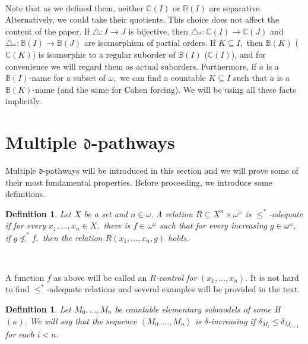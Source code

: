 \documentclass{article}%
\newtheorem{definition}[theorem]{Definition}
\begin{document}
\qquad\qquad\ \ 

Note that as we defined them, neither $\mathbb{C}\left(  I\right)  $ or
$\mathbb{B}\left(  I\right)  $ are separative. Alternatively, we could take
their quotients. This choice does not affect the content of the paper. If
$\triangle:I\longrightarrow J$ is bijective, then $\triangle_{\ast}%
:\mathbb{C}\left(  I\right)  \longrightarrow\mathbb{C}\left(  J\right)  $ and
$\triangle_{\ast}:\mathbb{B}\left(  I\right)  \longrightarrow\mathbb{B}\left(
J\right)  $ are isomorphism of partial orders. If $K\subseteq I,$ then
$\mathbb{B}\left(  K\right)  $ ($\mathbb{C}\left(  K\right)  $) is isomorphic
to a regular suborder of $\mathbb{B}\left(  I\right)  $ ($\mathbb{C}\left(
I\right)  $), and for convenience we will regard them as actual suborders.
Furthermore, if $\dot{a}$ is a $\mathbb{B}\left(  I\right)  $-name for a
subset of $\omega,$ we can find a countable $K\subseteq I$ such that $\dot{a}$
is a $\mathbb{B}\left(  K\right)  $-name (and the same for Cohen forcing). We
will be using all these facts implicitly.

\section{Multiple $\mathfrak{d}$-pathways \label{Seccion multiple pathways}}

Multiple $\mathfrak{d}$-pathways will be introduced in this section and we
will prove some of their most fundamental properties. Before proceeding, we
introduce some definitions.

\begin{definition}
Let $X$ be a set and $n\in\omega.$ A relation $R\subseteq X^{n}\times
\omega^{\omega}$ is $\leq^{\ast}$\emph{-adequate }if for every $x_{1}%
,...,x_{n}\in X,$ there is $f\in\omega^{\omega}$ such that for every
increasing $g\in\omega^{\omega},$ if $g\nleq^{\ast}f,$ then the relation
$R\left(  x_{1},...,x_{n},g\right)  $ holds.
\end{definition}

\qquad\qquad\ \ 

A function $f$ as above will be called an $R$\emph{-control for} $\left(
x_{1},...,x_{n}\right)  .$ It is not hard to find $\leq^{\ast}$-adequate
relations and several examples will be provided in the text.

\begin{definition}
Let $M_{0},...,M_{n}$ be countable elementary submodels of some \textsf{H}%
$\left(  \kappa\right)  .$ We will say that the sequence $\left\langle
M_{0},...,M_{n}\right\rangle $ is $\delta$\emph{-increasing }if $\delta
_{M_{i}}\leq\delta_{M_{i+1}}$ for each $i<n.$
\end{definition}
\end{document}

